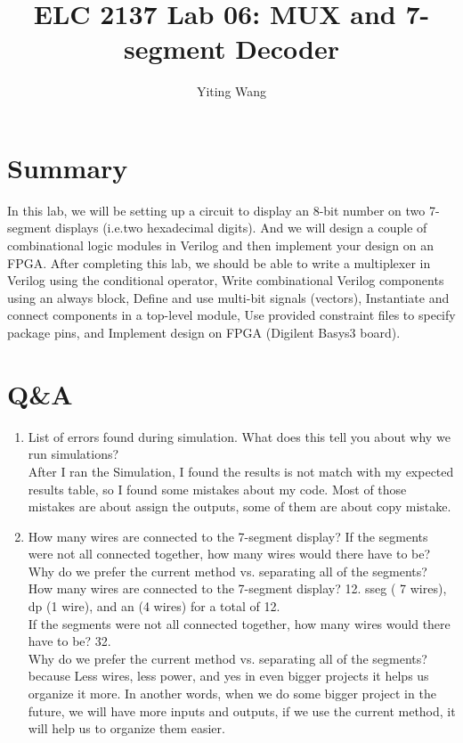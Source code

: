 \documentclass[11pt]{article}
\begin{document}
\title{ELC 2137 Lab 06: MUX and 7-segment Decoder}
\author{Yiting Wang}

\maketitle


\section*{Summary}

In this lab, we will be setting up a circuit to display an 8-bit number on two 7-segment displays (i.e.two  hexadecimal  digits). And we will design a couple of combinational logic modules in Verilog and then implement your design on an FPGA. After completing this lab, we should be able to write a multiplexer in Verilog using the conditional operator, Write combinational Verilog components using an always block, Define and use multi-bit signals (vectors), Instantiate and connect components in a top-level module, Use provided constraint files to specify package pins, and Implement design on FPGA (Digilent Basys3 board).\\



\section*{Q\&A}

\begin{enumerate}
	\item List of errors found during simulation. What does this tell you about why we run simulations?\\
	
	After I ran the Simulation, I found the results is not match with my  expected results table, so I found some mistakes about my code. Most of those mistakes are about assign the outputs, some of them are about copy mistake.\\
	
	\item How many wires are connected to the 7-segment display? If the segments were not all connected together, how many wires would there have to be? Why do we prefer the current method  vs. separating all of the segments?\\
	
	How many wires are connected to the 7-segment display? 12. sseg ( 7 wires), dp (1 wire), and an (4 wires) for a total of 12.\\ 
	
	If the segments were not all connected together, how many wires would there have to be? 32. \\
	
	Why do we prefer the current method  vs. separating all of the segments? because Less wires, less power, and yes in even bigger projects it helps us organize it more. In another words, when we do some bigger project in the future, we will have more inputs and outputs, if we use the current method, it will help us to organize them easier.\\
\end{enumerate}
\end{document}
